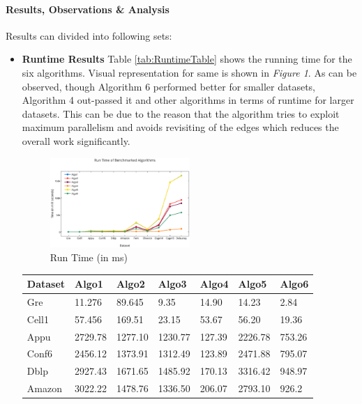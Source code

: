\paragraph{Results, Observations \& Analysis}
Results can divided into following sets:
\begin{itemize}
\item
\textbf{Runtime Results}
Table \ref{tab:RuntimeTable} shows the running time for the six algorithms.
Visual representation for same is shown in \emph{Figure 1}.
As can be observed, though Algorithm 6 performed better for smaller datasets,
Algorithm 4 out-passed it and other algorithms in terms of runtime for larger datasets.
This can be due to the reason that the algorithm tries to exploit maximum parallelism and
avoids revisiting of the edges which reduces the overall work significantly.
\begin{figure}[t]
    \centering
    \includegraphics[width=0.5\textwidth]{figures/RunTimeofBenchmarkedAlgorithms.eps}
    \caption{Run Time (in ms)}
    \label{fig:Run Time}
\end{figure}
\begin{table}[th]
\begin{center}
    \begin{tabular}{| l | l | l | l | l | l | l |}
    \hline
	Dataset & Algo1 & Algo2 & Algo3 & Algo4 & Algo5 & Algo6\\ \hline
    \hline
	Gre & 11.276 & 89.645 & 9.35 & 14.90 & 14.23 & \cellcolor{blue!25} 2.84\\ \hline
	Cell1 & 57.456 & 169.51 & 23.15 & 53.67 & 56.20 & \cellcolor{blue!25} 19.36\\ \hline
	Appu & 2729.78 & 1277.10 & 1230.77 & \cellcolor{blue!25} 127.39 & 2226.78 & 753.26\\ \hline
	Conf6 & 2456.12 & 1373.91 & 1312.49 & \cellcolor{blue!25} 123.89 & 2471.88 & 795.07\\ \hline
	Dblp & 2927.43 & 1671.65 & 1485.92 & \cellcolor{blue!25} 170.13 & 3316.42 & 948.97\\ \hline
	Amazon & 3022.22 & 1478.76 & 1336.50 & \cellcolor{blue!25} 206.07 & 2793.10 & 926.2\\ \hline

\end{tabular}
\end{center}
\end{table}
\end{itemize}
